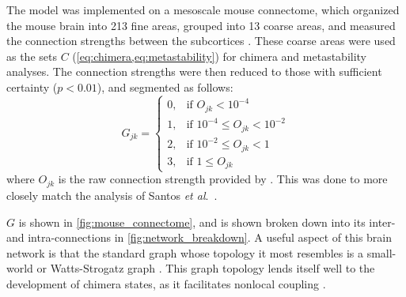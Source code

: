 The model was implemented on a mesoscale mouse connectome, which organized the mouse brain into 213 fine areas, grouped into 13 coarse areas, and measured the connection strengths between the subcortices \cite{Oh2014}.
These coarse areas were used as the sets $C$ (\cref{eq:chimera,eq:metastability}) for chimera and metastability analyses.
The connection strengths were then reduced to those with sufficient certainty ($p < 0.01$), and segmented as follows:
\begin{equation}
  \label{eq:mouse_segmentation}
  G_{j k}
  =
  \begin{cases}
    0, & \text{if } O_{j k} < 10^{-4} \\
    1, & \text{if } 10^{-4} \leq O_{j k} < 10^{-2} \\
    2, & \text{if } 10^{-2} \leq O_{j k} < 1 \\
    3, & \text{if } 1 \leq O_{j k}
  \end{cases}
\end{equation}
where $O_{j k}$ is the raw connection strength provided by \cite{Oh2014}.
This was done to more closely match the analysis of Santos \textit{et al}.\ \cite{Santos2017}.

$G$ is shown in \cref{fig:mouse_connectome}, and is shown broken down into its inter- and intra-connections in \cref{fig:network_breakdown}.
A useful aspect of this brain network is that the standard graph whose topology it most resembles is a small-world or Watts-Strogatz graph \cite{Oh2014}.
This graph topology lends itself well to the development of chimera states, as it facilitates nonlocal coupling \cite{Hizanidis2016}.

